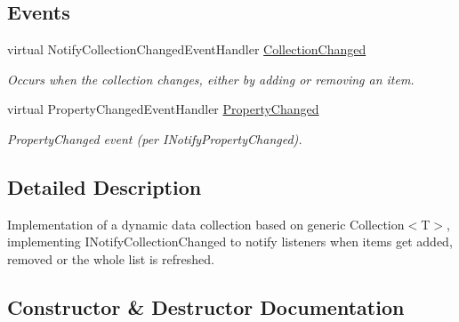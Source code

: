 \subsection*{Events}
\begin{DoxyCompactItemize}
\item 
virtual Notify\+Collection\+Changed\+Event\+Handler \hyperlink{class_system_1_1_collections_1_1_object_model_1_1_observable_collection_af4a88823a7235293115b1d962f2dcc12}{Collection\+Changed}
\begin{DoxyCompactList}\small\item\em Occurs when the collection changes, either by adding or removing an item. \end{DoxyCompactList}\item 
virtual Property\+Changed\+Event\+Handler \hyperlink{class_system_1_1_collections_1_1_object_model_1_1_observable_collection_a46a49f1d912c470379aaa46991277bb8}{Property\+Changed}
\begin{DoxyCompactList}\small\item\em Property\+Changed event (per I\+Notify\+Property\+Changed). \end{DoxyCompactList}\end{DoxyCompactItemize}


\subsection{Detailed Description}
Implementation of a dynamic data collection based on generic Collection$<$T$>$, implementing I\+Notify\+Collection\+Changed to notify listeners when items get added, removed or the whole list is refreshed. 



\subsection{Constructor \& Destructor Documentation}
\mbox{\label{class_system_1_1_collections_1_1_object_model_1_1_observable_collection_ab754865fa624829ded1806c558d80369}} 
